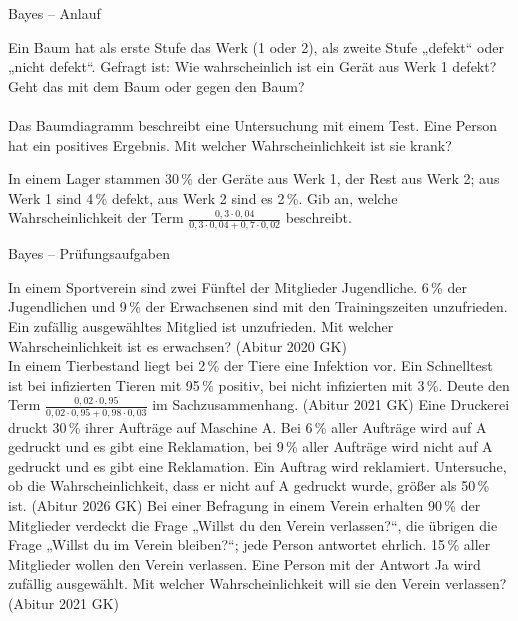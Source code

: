 \begin{aufgabe}{Bayes – Anlauf}
\begin{teile}
\teil Ein Baum hat als erste Stufe das Werk (1 oder 2), als zweite Stufe „defekt“ oder „nicht defekt“. Gefragt ist: Wie wahrscheinlich ist ein Gerät aus Werk 1 defekt? Geht das mit dem Baum oder gegen den Baum? \\  \\ 
\teil Das Baumdiagramm beschreibt eine Untersuchung mit einem Test. Eine Person hat ein positives Ergebnis. Mit welcher Wahrscheinlichkeit ist sie krank?

\leerfeld
\teil In einem Lager stammen 30\,\% der Geräte aus Werk 1, der Rest aus Werk 2; aus Werk 1 sind 4\,\% defekt, aus Werk 2 sind es 2\,\%. Gib an, welche Wahrscheinlichkeit der Term $\frac{0{,}3 \cdot 0{,}04}{0{,}3 \cdot 0{,}04 + 0{,}7 \cdot 0{,}02}$ beschreibt.
\end{teile}
\end{aufgabe}

\begin{aufgabe}{Bayes – Prüfungsaufgaben}
\begin{teile}
\teil In einem Sportverein sind zwei Fünftel der Mitglieder Jugendliche. 6\,\% der Jugendlichen und 9\,\% der Erwachsenen sind mit den Trainingszeiten unzufrieden. Ein zufällig ausgewähltes Mitglied ist unzufrieden. Mit welcher Wahrscheinlichkeit ist es erwachsen? \hfill (Abitur 2020 GK) \\ \leerfeld
\teil In einem Tierbestand liegt bei 2\,\% der Tiere eine Infektion vor. Ein Schnelltest ist bei infizierten Tieren mit 95\,\% positiv, bei nicht infizierten mit 3\,\%. Deute den Term $\frac{0{,}02 \cdot 0{,}95}{0{,}02 \cdot 0{,}95 + 0{,}98 \cdot 0{,}03}$ im Sachzusammenhang. \hfill (Abitur 2021 GK)
\teil Eine Druckerei druckt 30\,\% ihrer Aufträge auf Maschine A. Bei 6\,\% aller Aufträge wird auf A gedruckt und es gibt eine Reklamation, bei 9\,\% aller Aufträge wird nicht auf A gedruckt und es gibt eine Reklamation. Ein Auftrag wird reklamiert. Untersuche, ob die Wahrscheinlichkeit, dass er nicht auf A gedruckt wurde, größer als 50\,\% ist. \hfill (Abitur 2026 GK)
\teil Bei einer Befragung in einem Verein erhalten 90\,\% der Mitglieder verdeckt die Frage „Willst du den Verein verlassen?“, die übrigen die Frage „Willst du im Verein bleiben?“; jede Person antwortet ehrlich. 15\,\% aller Mitglieder wollen den Verein verlassen. Eine Person mit der Antwort Ja wird zufällig ausgewählt. Mit welcher Wahrscheinlichkeit will sie den Verein verlassen? \hfill (Abitur 2021 GK) \\ \leerfeld
\end{teile}
\end{aufgabe}

